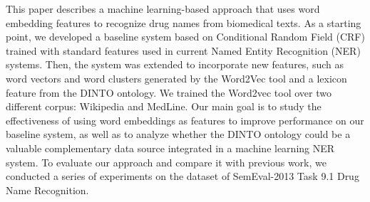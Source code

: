 This paper describes a machine learning-based approach that uses word embedding features to recognize drug names from biomedical texts. As a starting point, we developed a baseline system based on Conditional Random Field (CRF) trained with standard features used in current Named Entity Recognition (NER) systems. Then, the system was extended to incorporate new features, such as word vectors and word clusters generated by the Word2Vec tool and a lexicon feature from the DINTO ontology. We trained the Word2vec tool over two different corpus: Wikipedia and MedLine. Our main goal is to study the effectiveness of using word embeddings as features to improve performance on our baseline system, as well as to analyze whether the DINTO ontology could be a valuable complementary data source integrated in a machine learning NER system. To evaluate our approach and compare it with previous work, we conducted a series of experiments on the dataset of SemEval-2013 Task 9.1 Drug Name Recognition.
